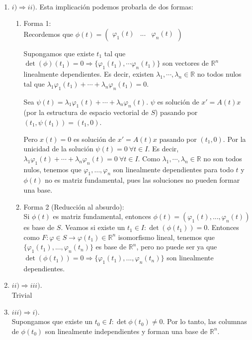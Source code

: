 \documentclass{article}
\makeatletter
\theoremstyle{theorem-style}  %
\theoremstyle{definition-style}
\theoremstyle{example-style}
\renewenvironment{proof}[1][\proofname]{\par
	\pushQED{\qed}%
	\normalfont \topsep6\p@\@plus6\p@\relax
	\list{}{%
		\settowidth{\leftmargin}{\quad:\hskip\labelsep}%
		\setlength{\labelwidth}{0pt}%
		\setlength{\itemindent}{-\leftmargin}%
	}%
	\item[\hskip\labelsep\itshape#1\@addpunct{:}]\ignorespaces
}{%
	\popQED\endlist\@endpefalse
}
\makeatother
\begin{document}
\begin{proof}\
	\begin{enumerate}
		\item $ i) \Rightarrow ii) $. Esta implicación podemos probarla de dos formas:
		\begin{enumerate}[\quad a)]
			\item Forma 1: \\
			Recordemos que $ \phi (t)= \begin{pmatrix}
			\varphi_1(t) & ... & \varphi_n(t)
			\end{pmatrix} $
			
			Supongamos que existe $ t_1 $ tal que  $ \det(\phi)(t_1)=0\Rightarrow \{ \varphi_1(t_1), \cdots \varphi_n (t_1) \} $ son vectores de $ \mathbb{R}^n  $ linealmente dependientes. Es decir, existen $ \lambda_1, \cdots, \lambda_n \in \mathbb{R}$ no todos nulos tal que $ \lambda_1 \varphi_1(t_1) + \cdots +\lambda_n\varphi_n(t_1)=0 $.
			
			Sea $ \psi(t)=\lambda_1 \varphi_1(t) + \cdots +\lambda_n\varphi_n(t) $. $ \psi $ es solución de $ x'=A(t)x $ (por la estructura de espacio vectorial de $ S $) pasando por $ (t_1,\psi(t_1))=(t_1,0) $.
			
			Pero $ x(t)=0 $ es solución de $ x'=A(t)x$ pasando por $ (t_1,0) $.
			Por la unicidad de la solución $ \psi(t)=0 \ \forall t \in I$. Es decir, $ \lambda_1 \varphi_1(t) + \cdots +\lambda_n\varphi_n(t) =0 \ \forall t \in I $. Como   $ \lambda_1, \cdots, \lambda_n \in \mathbb{R}$ no son  todos nulos, tenemos que $ \varphi_1, \dots, \varphi_n $ son linealmente dependientes para todo $ t $ y $ \phi(t) $ no es matriz fundamental, pues las soluciones no pueden formar una base.
			\item Forma 2 (Reducción al absurdo): \\
			Si $ \phi(t) $ es matriz fundamental, entonces $ \phi(t)=(\varphi_1(t), ... , \varphi_n(t)) $ es base de $ S $.
			Veamos si existe un $ t_1 \in I : \det(\phi(t_1))=0$.
			Entonces como $ F:\varphi\in S\longrightarrow \varphi(t_1)\in  \mathbb{R}^n $ isomorfismo lineal, tenemos que $ \{ \varphi_1(t_1), ... , \varphi_n(t_n) \}  $ es base de $ \mathbb{R}^n $, pero no puede ser ya que $ \det(\phi(t_1))=0 \Rightarrow \{ \varphi_1(t_1), ... , \varphi_n(t_n) \} $ son linealmente dependientes.
		\end{enumerate}
	\item $ ii) \Rightarrow iii) $. \\
	Trivial
	\item $ iii) \Rightarrow i) $. \\
	Supongamos que existe un $ t_0 \in I : \det \phi (t_0)\neq 0 $. Por lo tanto, las columnas de $ \phi(t_0) $ son linealmente independientes y forman una base de $ \mathbb{R}^n $.
	

\end{enumerate}
\end{proof}
\end{document}
